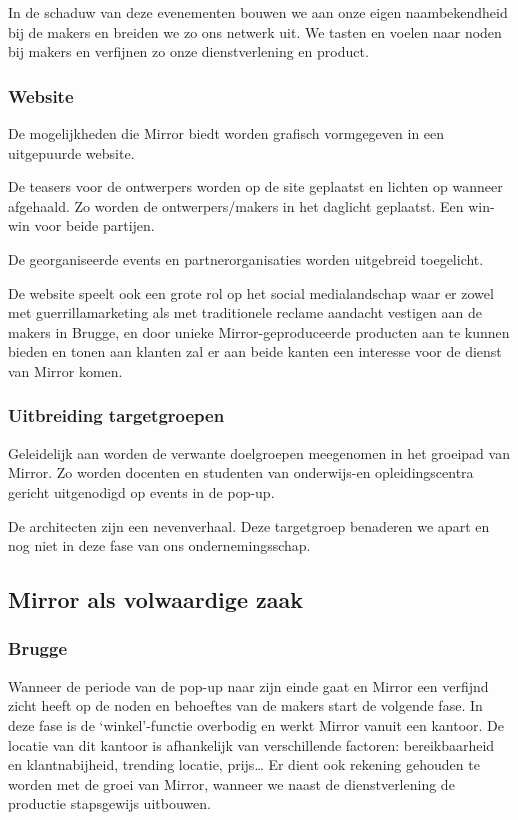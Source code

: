 In de schaduw van deze evenementen bouwen we aan onze eigen naambekendheid bij de makers en breiden we zo ons netwerk uit. We tasten en voelen naar noden bij makers en verfijnen zo onze dienstverlening en product.

\subsubsection{Website} %
\label{ssub:website}
De mogelijkheden die Mirror biedt worden grafisch vormgegeven in een uitgepuurde website.

De teasers voor de ontwerpers worden op de site geplaatst en lichten op wanneer afgehaald. Zo worden de ontwerpers/makers in het daglicht geplaatst. Een win-win voor beide partijen.

De georganiseerde events en partnerorganisaties worden uitgebreid toegelicht.

De website speelt ook een grote rol op het social medialandschap waar er zowel met guerrillamarketing als met traditionele reclame aandacht vestigen aan de makers in Brugge, en door unieke Mirror-geproduceerde producten aan te kunnen bieden en tonen aan klanten zal er aan beide kanten een interesse voor de dienst van Mirror komen.

\subsubsection{Uitbreiding targetgroepen} %
\label{ssub:uitbreiding_targetgroepen}
Geleidelijk aan worden de verwante doelgroepen meegenomen in het groeipad van Mirror. Zo worden docenten en studenten van onderwijs-en opleidingscentra gericht uitgenodigd op events in de pop-up.

De architecten zijn een nevenverhaal. Deze targetgroep benaderen we apart en nog niet in deze fase van ons ondernemingsschap.


\subsection{Mirror als volwaardige zaak} %
\label{sub:mirror_als_volwaardige_zaak}

\subsubsection{Brugge} %
\label{ssub:brugge}
Wanneer de periode van de pop-up naar zijn einde gaat en Mirror een verfijnd zicht heeft op de noden en behoeftes van de makers start de volgende fase. In deze fase is de `winkel'-functie overbodig en werkt Mirror vanuit een kantoor. De locatie van dit kantoor is afhankelijk van verschillende factoren: bereikbaarheid en klantnabijheid, trending locatie, prijs… Er dient ook rekening gehouden te worden met de groei van Mirror, wanneer we naast de dienstverlening de productie stapsgewijs uitbouwen.

